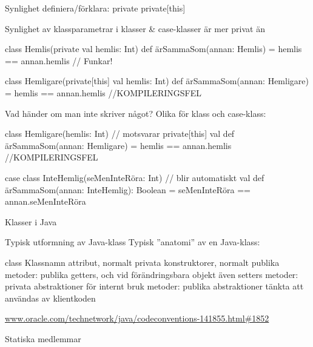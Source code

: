 \begin{Slide}{Synlighet}
definiera/förklara:
private
private[this]
\end{Slide}


\begin{Slide}{Synlighet av klassparametrar i klasser \& case-klasser}\SlideFontSmall
{} är  mer privat än  
\begin{Code}
class Hemlis(private val hemlis: Int) {
  def ärSammaSom(annan: Hemlis) = hemlis == annan.hemlis   // Funkar!
}

class Hemligare(private[this] val hemlis: Int) {
  def ärSammaSom(annan: Hemligare) = hemlis == annan.hemlis //KOMPILERINGSFEL
}
\end{Code}
Vad händer om man inte skriver något? Olika för klass och case-klass:
\begin{Code}
class Hemligare(hemlis: Int) { // motsvarar private[this] val
  def ärSammaSom(annan: Hemligare) = hemlis == annan.hemlis //KOMPILERINGSFEL
}

case class InteHemlig(seMenInteRöra: Int) { // blir automatiskt val 
  def ärSammaSom(annan: InteHemlig): Boolean = 
    seMenInteRöra == annan.seMenInteRöra 
}

\end{Code}
\end{Slide}



\begin{Slide}{Klasser i Java}
\end{Slide}

\begin{Slide}{Typisk utformning av Java-klass}
Typisk ''anatomi'' av en Java-klass:
\begin{Code}[language=Java]
class Klassnamn {
    attribut, normalt privata
    konstruktorer, normalt publika
    metoder: publika getters, och vid förändringsbara objekt även setters
    metoder: privata abstraktioner för internt bruk
    metoder: publika abstraktioner tänkta att användas av klientkoden 
}
\end{Code}
\href{http://www.oracle.com/technetwork/java/codeconventions-141855.html#1852}{www.oracle.com/technetwork/java/codeconventions-141855.html\#1852}
\end{Slide}

\begin{Slide}{Statiska medlemmar}
\end{Slide}


